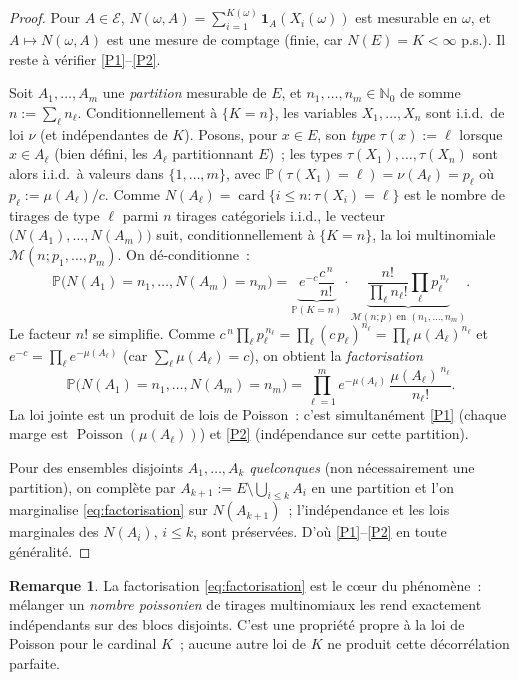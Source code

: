 \documentclass[11pt,a4paper]{article}
\theoremstyle{plain}
\theoremstyle{definition}
\newtheorem{remarque}[theoreme]{Remarque}
\newcommand{\N}{\mathbb{N}}
\newcommand{\PP}{\mathbb{P}}
\newcommand{\Poi}{\operatorname{Poisson}}
\newcommand{\one}{\mathbf{1}}
\newcommand{\calE}{\mathcal{E}}
\DeclareMathOperator{\card}{card}
\begin{document}
\begin{proof}
Pour $A\in\calE$, $N(\omega,A)=\sum_{i=1}^{K(\omega)}\one_A(X_i(\omega))$ est mesurable en $\omega$, et $A\mapsto N(\omega,A)$ est une mesure de comptage (finie, car $N(E)=K<\infty$ p.s.). Il reste à vérifier \ref{P1}--\ref{P2}.

Soit $A_1,\dots,A_m$ une \emph{partition} mesurable de $E$, et $n_1,\dots,n_m\in\N_0$ de somme $n:=\sum_\ell n_\ell$. Conditionnellement à $\{K=n\}$, les variables $X_1,\dots,X_n$ sont i.i.d.\ de loi $\nu$ (et indépendantes de $K$). Posons, pour $x\in E$, son \emph{type} $\tau(x):=\ell$ lorsque $x\in A_\ell$ (bien défini, les $A_\ell$ partitionnant $E$)~; les types $\tau(X_1),\dots,\tau(X_n)$ sont alors i.i.d.\ à valeurs dans $\{1,\dots,m\}$, avec $\PP(\tau(X_1)=\ell)=\nu(A_\ell)=p_\ell$ où $p_\ell:=\mu(A_\ell)/c$. Comme $N(A_\ell)=\card\{i\le n:\tau(X_i)=\ell\}$ est le nombre de tirages de type $\ell$ parmi $n$ tirages catégoriels i.i.d., le vecteur $\big(N(A_1),\dots,N(A_m)\big)$ suit, conditionnellement à $\{K=n\}$, la loi multinomiale $\mathcal M(n;p_1,\dots,p_m)$. On dé-conditionne~:
\[
\PP\big(N(A_1)=n_1,\dots,N(A_m)=n_m\big)
= \underbrace{e^{-c}\frac{c^{\,n}}{n!}}_{\PP(K=n)}
\cdot
\underbrace{\frac{n!}{\prod_\ell n_\ell!}\prod_\ell p_\ell^{\,n_\ell}}_{\mathcal M(n;p)\ \text{en }(n_1,\dots,n_m)}.
\]
Le facteur $n!$ se simplifie. Comme $c^{\,n}\prod_\ell p_\ell^{\,n_\ell}=\prod_\ell (c\,p_\ell)^{n_\ell}=\prod_\ell\mu(A_\ell)^{n_\ell}$ et $e^{-c}=\prod_\ell e^{-\mu(A_\ell)}$ (car $\sum_\ell\mu(A_\ell)=c$), on obtient la \emph{factorisation}
\begin{equation}\label{eq:factorisation}
\PP\big(N(A_1)=n_1,\dots,N(A_m)=n_m\big)
= \prod_{\ell=1}^{m} e^{-\mu(A_\ell)}\,\frac{\mu(A_\ell)^{\,n_\ell}}{n_\ell!}.
\end{equation}
La loi jointe est un produit de lois de Poisson~: c'est simultanément \ref{P1} (chaque marge est $\Poi(\mu(A_\ell))$) et \ref{P2} (indépendance sur cette partition).

Pour des ensembles disjoints $A_1,\dots,A_k$ \emph{quelconques} (non nécessairement une partition), on complète par $A_{k+1}:=E\setminus\bigcup_{i\le k}A_i$ en une partition et l'on marginalise \eqref{eq:factorisation} sur $N(A_{k+1})$~; l'indépendance et les lois marginales des $N(A_i)$, $i\le k$, sont préservées. D'où \ref{P1}--\ref{P2} en toute généralité.
\end{proof}

\begin{remarque}
La factorisation \eqref{eq:factorisation} est le c\oe ur du phénomène~: mélanger un \emph{nombre poissonien} de tirages multinomiaux les rend exactement indépendants sur des blocs disjoints. C'est une propriété propre à la loi de Poisson pour le cardinal $K$~; aucune autre loi de $K$ ne produit cette décorrélation parfaite.
\end{remarque}
\end{document}
